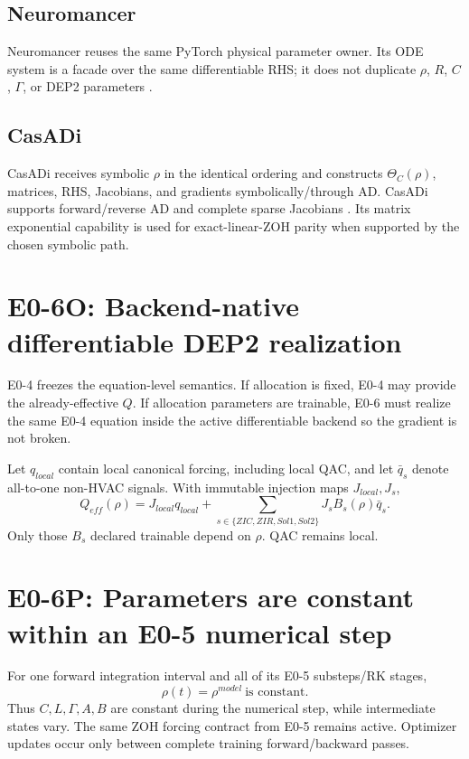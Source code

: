 \documentclass[11pt]{article}
\begin{document}
\subsection{Neuromancer}
Neuromancer reuses the same PyTorch physical parameter owner. Its ODE system is a
facade over the same differentiable RHS; it does not duplicate $\rho$, $R$, $C$,
$\Gamma$, or DEP2 parameters \cite{Neuromancer2023,NeuromancerDocs2026}.

\subsection{CasADi}
CasADi receives symbolic $\rho$ in the identical ordering and constructs
$\Theta_C(\rho)$, matrices, RHS, Jacobians, and gradients symbolically/through AD.
CasADi supports forward/reverse AD and complete sparse Jacobians
\cite{Andersson2019CasADi,CasADiDocs2026}. Its matrix exponential capability is
used for exact-linear-ZOH parity when supported by the chosen symbolic path.

\section{E0-6O: Backend-native differentiable DEP2 realization}

E0-4 freezes the equation-level semantics. If allocation is fixed, E0-4 may
provide the already-effective $Q$. If allocation parameters are trainable, E0-6
must realize the same E0-4 equation inside the active differentiable backend so
the gradient is not broken.

Let $q_{local}$ contain local canonical forcing, including local QAC, and let
$\bar q_s$ denote all-to-one non-HVAC signals. With immutable injection maps
$J_{local},J_s$,
\[
\boxed{
Q_{eff}(\rho)=J_{local}q_{local}
+\sum_{s\in\{ZIC,ZIR,Sol1,Sol2\}}
J_sB_s(\rho)\bar q_s.
}
\]
Only those $B_s$ declared trainable depend on $\rho$. QAC remains local.

\section{E0-6P: Parameters are constant within an E0-5 numerical step}

For one forward integration interval and all of its E0-5 substeps/RK stages,
\[
\boxed{\rho(t)=\rho^{model}\ \text{is constant}.}
\]
Thus $C,L,\Gamma,A,B$ are constant during the numerical step, while intermediate
states vary. The same ZOH forcing contract from E0-5 remains active.
Optimizer updates occur only between complete training forward/backward passes.
\end{document}

